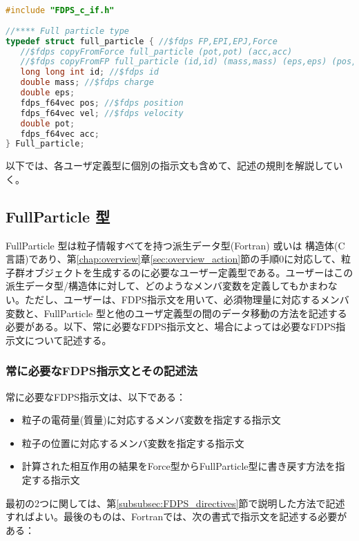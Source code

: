 \begin{lstlisting}[language=C,caption=ユーザ定義型の例 (C言語),label=listing:FP_example_in_C]
#include "FDPS_c_if.h"
   
//**** Full particle type
typedef struct full_particle { //$fdps FP,EPI,EPJ,Force
   //$fdps copyFromForce full_particle (pot,pot) (acc,acc)
   //$fdps copyFromFP full_particle (id,id) (mass,mass) (eps,eps) (pos,pos) 
   long long int id; //$fdps id
   double mass; //$fdps charge
   double eps;
   fdps_f64vec pos; //$fdps position
   fdps_f64vec vel; //$fdps velocity
   double pot;
   fdps_f64vec acc;
} Full_particle;
\end{lstlisting}



以下では、各ユーザ定義型に個別の指示文も含めて、記述の規則を解説していく。

\subsection{FullParticle 型}
\label{subsec:FullParticle}
FullParticle 型は粒子情報すべてを持つ派生データ型(Fortran) 或いは 構造体(C言語)であり、第\ref{chap:overview}章\ref{sec:overview_action}節の手順0に対応して、粒子群オブジェクトを生成するのに必要なユーザー定義型である。ユーザーはこの派生データ型/構造体に対して、どのようなメンバ変数を定義してもかまわない。ただし、ユーザーは、FDPS指示文を用いて、必須物理量に対応するメンバ変数と、FullParticle 型と他のユーザ定義型の間のデータ移動の方法を記述する必要がある。以下、常に必要なFDPS指示文と、場合によっては必要なFDPS指示文について記述する。

\subsubsection{常に必要なFDPS指示文とその記述法}
\label{subsubsec:FP:FDPS_directives:always_required}
常に必要なFDPS指示文は、以下である：
\begin{itemize}[leftmargin=*,itemsep=-1ex]
\item 粒子の電荷量(質量)に対応するメンバ変数を指定する指示文
\item 粒子の位置に対応するメンバ変数を指定する指示文
\item 計算された相互作用の結果をForce型からFullParticle型に書き戻す方法を指定する指示文
\end{itemize}
最初の2つに関しては、第\ref{subsubsec:FDPS_directives}節で説明した方法で記述すればよい。最後のものは、Fortranでは、次の書式で指示文を記述する必要がある：

